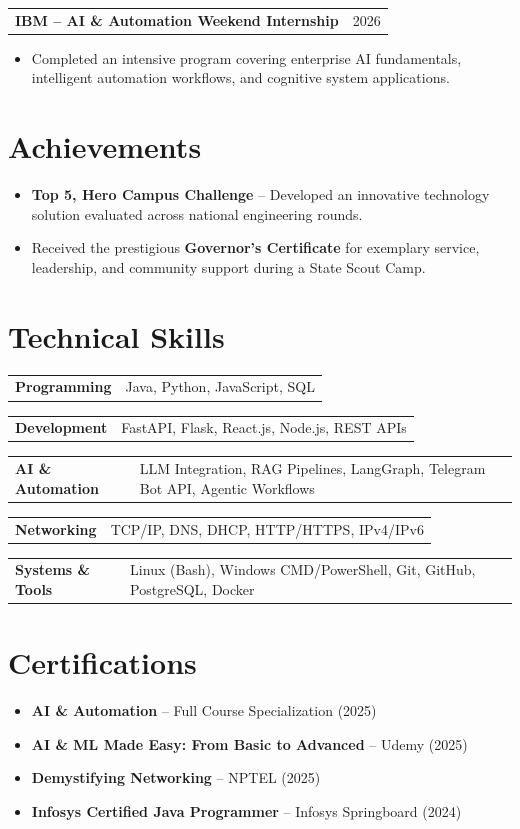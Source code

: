 \documentclass[10pt,a4paper]{article}
\makeatletter
\newcommand{\headingrow}[2]{%
    \noindent
    \begin{tabularx}{\textwidth}{@{}X r@{}}
        \textbf{\color{darktext}#1} & {\small\color{graytext}#2}
    \end{tabularx}\par
}
\newcommand{\skillrow}[2]{%
    \noindent
    \begin{tabularx}{\textwidth}{@{}p{1.45in}@{\hspace{5pt}}X@{}}
        \textbf{\color{darktext}#1} & {\small\color{graytext}#2}
    \end{tabularx}\par
    \vspace{1.5pt}
}
\makeatother
\begin{document}
\headingrow{IBM -- AI \& Automation Weekend Internship}{2026}
\begin{itemize}
    \item {\small\color{graytext}Completed an intensive program covering enterprise AI fundamentals, intelligent automation workflows, and cognitive system applications.}
\end{itemize}

\section{Achievements}

\begin{itemize}
    \item {\small\color{graytext}\textbf{Top 5, Hero Campus Challenge} -- Developed an innovative technology solution evaluated across national engineering rounds.}
    \item {\small\color{graytext}Received the prestigious \textbf{Governor's Certificate} for exemplary service, leadership, and community support during a State Scout Camp.}
\end{itemize}

\section{Technical Skills}

\skillrow{Programming}{Java, Python, JavaScript, SQL}
\skillrow{Development}{FastAPI, Flask, React.js, Node.js, REST APIs}
\skillrow{AI \& Automation}{LLM Integration, RAG Pipelines, LangGraph, Telegram Bot API, Agentic Workflows}
\skillrow{Networking}{TCP/IP, DNS, DHCP, HTTP/HTTPS, IPv4/IPv6}
\skillrow{Systems \& Tools}{Linux (Bash), Windows CMD/PowerShell, Git, GitHub, PostgreSQL, Docker}

\section{Certifications}

\begin{itemize}
    \item {\small\color{graytext}\textbf{AI \& Automation} -- Full Course Specialization (2025)}
    \item {\small\color{graytext}\textbf{AI \& ML Made Easy: From Basic to Advanced} -- Udemy (2025)}
    \item {\small\color{graytext}\textbf{Demystifying Networking} -- NPTEL (2025)}
    \item {\small\color{graytext}\textbf{Infosys Certified Java Programmer} -- Infosys Springboard (2024)}
\end{itemize}
\end{document}
